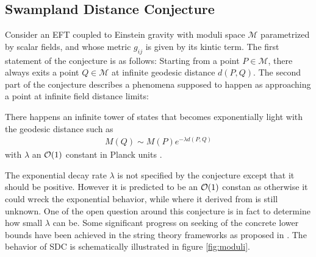\subsection{Swampland Distance Conjecture}
Consider an EFT coupled to Einstein gravity with moduli space $\mathcal{M}$ parametrized by scalar fields, and whose metric $g_{ij}$ is given by its kintic term. The first statement of the conjecture is as follows: Starting from a point $P \in \mathcal{M}$, there always exits a point $Q \in \mathcal{M}$ at infinite geodesic distance $d(P,Q)$. The second part of the conjecture describes a phenomena supposed to happen as approaching a point at infinite field distance limits:
\begin{tcolorbox}[title=Swampland Distance Conjecture,
    title filled=false,
    colback=blue!5!white,
    colframe=blue!75!black]
    There happens an infinite tower of states that becomes exponentially light with the geodesic distance such as 
    \begin{align}
        M(Q) \sim M(P) e^{-\lambda d(P,Q)}
    \end{align}
    with $\lambda$ an $\order*{1}$ constant in Planck units \parencite{ooguri_geometry_2007}. 
\end{tcolorbox}
The exponential decay rate $\lambda$ is not specified by the conjecture except that it should be positive. However it is predicted to be an $\order{1}$ constan as otherwise it could wreck the exponential behavior, while where it derived from is still unknown. One of the open question around this conjecture is in fact to determine how small $\lambda$ can be. Some significant progress on seeking of the concrete lower bounds have been achieved in the string theory frameworks as proposed in \parencite{gendler_merging_2021, bedroya_trans-planckian_2020, andriot_web_2020, lanza_swampland_2021}.
The behavior of SDC is schematically illustrated in figure \ref{fig:moduli}.
